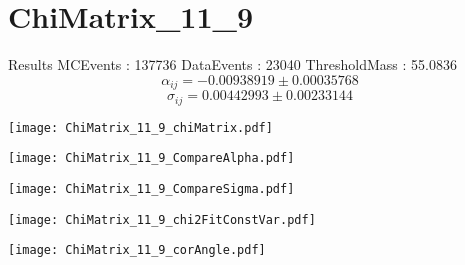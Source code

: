 \documentclass[a4paper,12pt]{article}
\begin{document}
\section{ChiMatrix\_11\_9}
\begin{minipage}{0.49\linewidth} Results \newline
MCEvents : 137736\newline
DataEvents : 23040 \newline
ThresholdMass : 55.0836\\
$$\alpha_{ij} = -0.00938919\pm 0.00035768$$
$$\sigma_{ij} = 0.00442993\pm 0.00233144$$
\end{minipage}\hfill
\begin{minipage}{0.49\linewidth} 
\texttt{[image: ChiMatrix\_11\_9\_chiMatrix.pdf]}\\
\end{minipage}
\hfill
\begin{minipage}{0.49\linewidth} 
\texttt{[image: ChiMatrix\_11\_9\_CompareAlpha.pdf]}\\
\end{minipage}
\hfill
\begin{minipage}{0.49\linewidth} 
\texttt{[image: ChiMatrix\_11\_9\_CompareSigma.pdf]}\\
\end{minipage}
\begin{minipage}{0.49\linewidth} 
\texttt{[image: ChiMatrix\_11\_9\_chi2FitConstVar.pdf]}\\
\end{minipage}
\hfill
\begin{minipage}{0.49\linewidth} 
\texttt{[image: ChiMatrix\_11\_9\_corAngle.pdf]}\\
\end{minipage}
\end{document}
